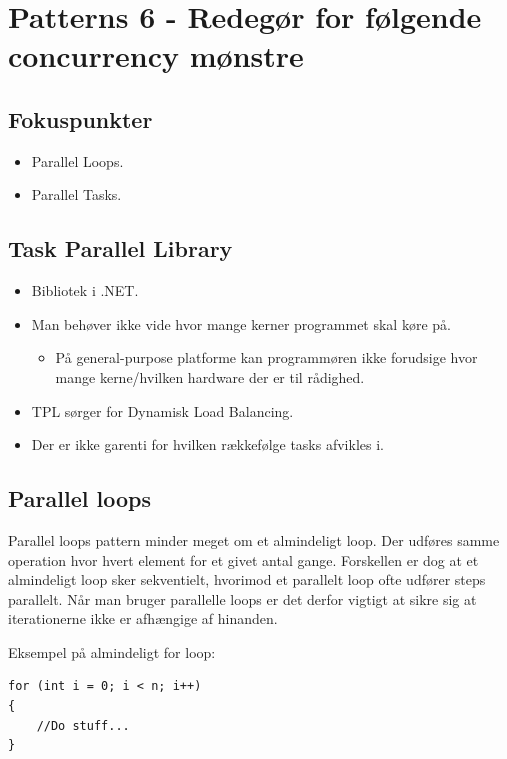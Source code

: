 \section{Patterns 6 - Redegør for følgende concurrency mønstre}

\subsection{Fokuspunkter}

\begin{itemize}
	\item Parallel Loops.
	\item Parallel Tasks.
\end{itemize}

\subsection{Task Parallel Library}
\begin{itemize}
	\item Bibliotek i .NET.
	\item Man behøver ikke vide hvor mange kerner programmet skal køre på.
	\begin{itemize}
		\item På general-purpose platforme kan programmøren ikke forudsige hvor mange kerne/hvilken hardware der er til rådighed.
	\end{itemize}
	\item TPL sørger for Dynamisk Load Balancing.
	\item Der er ikke garenti for hvilken rækkefølge tasks afvikles i. 
\end{itemize}

\subsection{Parallel loops}

Parallel loops pattern minder meget om et almindeligt loop. Der udføres samme operation hvor hvert element for et givet antal gange. Forskellen er dog at et almindeligt loop sker sekventielt, hvorimod et parallelt loop ofte udfører steps parallelt. Når man bruger parallelle loops er det derfor vigtigt at sikre sig at iterationerne ikke er afhængige af hinanden.

Eksempel på almindeligt for loop:

\begin{lstlisting}[caption=Normal for loop, label=code:normalLoop]
for (int i = 0; i < n; i++)
{
	//Do stuff...
}
\end{lstlisting}

